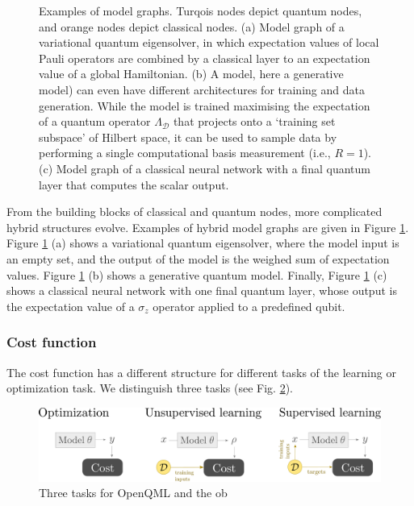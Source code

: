 \documentclass[aps,pra,10pt,twocolumn,groupedaddress,nofootinbib]{revtex4-1}
\theoremstyle{plain}
\begin{document}
\begin{figure}[t]
\begin{flushleft}
\end{flushleft}
\caption{Examples of model graphs. Turqois nodes depict quantum nodes, and orange nodes depict classical nodes. (a) Model graph of a variational quantum eigensolver, in which expectation values of local Pauli operators are combined by a classical layer to an expectation value of a global Hamiltonian. (b)  A model, here a generative model) can even have different architectures for training and data generation. While the model is trained maximising the expectation of a quantum operator $\Lambda_{\mathcal{D}}$ that projects onto a `training set subspace' of Hilbert space, it can be used to sample data by performing a single computational basis measurement (i.e., $R=1$). (c) Model graph of a classical neural network with a final quantum layer that computes the scalar output.}
\label{Fig:example_modelgraphs}
\end{figure}


From the building blocks of classical and quantum nodes, more complicated hybrid structures evolve. Examples of hybrid model graphs are given in Figure \ref{Fig:example_modelgraphs}. Figure \ref{Fig:example_modelgraphs} (a) shows a variational quantum eigensolver, where the model input is an empty set, and the output of the model is the weighed sum of expectation values. Figure \ref{Fig:example_modelgraphs} (b) shows a generative quantum model. Finally, Figure \ref{Fig:example_modelgraphs} (c) shows a classical neural network with one final quantum layer, whose output is the expectation value of a $\sigma_z$ operator applied to a predefined qubit. 



\subsubsection{Cost function}
The cost function has a different structure for different tasks of the learning or optimization task. We distinguish three tasks (see Fig. \ref{Fig:tasks}).\\


\begin{figure}[t]
\includegraphics[scale=0.08]{tasks.pdf}
\caption{Three tasks for OpenQML and the ob}
\label{Fig:tasks}
\end{figure}
\end{document}
